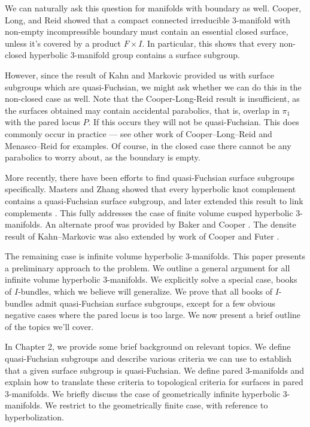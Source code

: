 We can naturally ask this question for manifolds with boundary as well.
Cooper, Long, and Reid showed \cite{CLR} that a compact connected irreducible
3-manifold with non-empty incompressible boundary  must contain an essential
closed surface, unless it's covered by a product $F\times I$. In particular,
this shows that every non-closed hyperbolic 3-manifold group contains a surface
subgroup.

However, since the result of Kahn and Markovic provided us with surface
subgroups which are quasi-Fuchsian, we might ask whether we can do this in the
non-closed case as well. Note that the Cooper-Long-Reid result is insufficient,
as the surfaces obtained may contain accidental parabolics, that is, overlap in
$\pi_1$ with the pared locus $P$. If this occurs they will not be
quasi-Fuchsian. This does commonly occur in practice --- see other work of
Cooper--Long--Reid \cite{CLRbundles} and Menasco--Reid \cite{MenascoReid} for
examples.  Of course, in the closed case there cannot be any parabolics to
worry about, as the boundary is empty.

More recently, there have been efforts to find quasi-Fuchsian surface subgroups
specifically. Masters and Zhang \cite{MZ} showed that every hyperbolic knot
complement contains a quasi-Fuchsian surface subgroup, and later extended this
result to link complements \cite{MZ2}. This fully addresses the case of finite
volume cusped hyperbolic 3-manifolds. An alternate proof was provided by Baker
and Cooper \cite{BC}. The densite result of Kahn--Markovic was also extended by
work of Cooper and Futer \cite{CooperFuter}.

The remaining case is infinite volume hyperbolic 3-manifolds. This paper
presents a preliminary approach to the problem. We outline a general argument
for all infinite volume hyperbolic 3-manifolds. We explicitly solve a special
case, books of $I$-bundles, which we believe will generalize. We prove that all
books of $I$-bundles admit quasi-Fuchsian surface subgroups, except for a few
obvious negative cases where the pared locus is too large. We now present
a brief outline of the topics we'll cover.

In Chapter 2, we provide some brief background on relevant topics. We define
quasi-Fuchsian subgroups and describe various criteria we can use to establish
that a given surface subgroup is quasi-Fuchsian. We define pared 3-manifolds
and explain how to translate these criteria to topological criteria for
surfaces in pared 3-manifolds. We briefly discuss the case of geometrically
infinite hyperbolic 3-manifolds. We restrict to the geometrically finite case,
with reference to hyperbolization.

